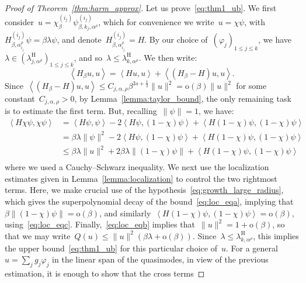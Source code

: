 \documentclass[10pt]{article}
\newcommand{\1}{\mathbbm 1}
\newcommand{\deltaScalingExp}{s}
\newcommand{\shift}{\rho} %
\renewcommand{\o}{\mathrm{o}}
\begin{document}
\begin{proof}[Proof of Theorem~\ref{thm:harm_approx}]
        Let us prove~\eqref{eq:thm1_ub}.
        We first consider~$u = \chi_\beta^{(i_j)} \psi_{\beta,k_j,\alpha^\shift}^{(i_j)}$, which for convenience we write~$u=\chi\psi$, with~$H_{\beta,\alpha_{i_j}^\shift}^{(i_j)} \psi = \beta\lambda\psi$, and denote~$H_{\beta,\alpha_{i_j}^\shift}^{(i_j)}=H$.
        By our choice of~$(\varphi_j)_{1\leq j\leq k}$, we have~$\lambda \in (\lambda_{j,\alpha^\shift}^{\mathrm H})_{1\leq j\leq k}$, and so~$\lambda\leq \lambda_{k,\alpha^\shift}^{\mathrm H}$.
        We then write:
        \[\left\langle H_\beta u,u\right\rangle = \left\langle H u,u\right\rangle + \left\langle (H_\beta - H)u,u\right\rangle.\]
        Since~$\left\langle (H_\beta-H)u,u\right\rangle \leq C_{j,\alpha,\shift}\beta^{3\deltaScalingExp+\frac12}\|u\|^2 = \o(\beta)\|u\|^2$ for some constant~$C_{j,\alpha,\shift}>0$, by Lemma~\ref{lemma:taylor_bound}, the only remaining task is to estimate the first term.
        But, recalling~$\|\psi\| = 1$, we have:
        \[\begin{aligned}
            \left\langle H\chi\psi,\chi\psi\right\rangle &= \left\langle H\psi,\psi\right\rangle - 2\left\langle H\psi,(1-\chi)\psi\right\rangle + \left\langle H(1-\chi)\psi,(1-\chi)\psi\right\rangle\\
            & = \beta\lambda\|\psi\|^2 - 2\left\langle H\psi,(1-\chi)\psi\right\rangle + \left\langle H(1-\chi)\psi,(1-\chi)\psi\right\rangle\\
            &\leq \beta\lambda\|u\|^2 + 2\beta\lambda\|(1-\chi)\psi\| + \left\langle H(1-\chi)\psi,(1-\chi)\psi\right\rangle\\
        \end{aligned}\]
        where we used a Cauchy--Schwarz inequality.
        We next use the localization estimates given in Lemma~\ref{lemma:localization} to control the two rightmost terms. Here, we make crucial use of the hypothesis~\eqref{eq:growth_large_radius},
        which gives the superpolynomial decay of the bound~\eqref{eq:loc_eqa}, implying that~$\beta\|(1-\chi)\psi\|=\o(\beta)$, and similarly~$\left\langle H(1-\chi)\psi,(1-\chi)\psi\right\rangle = \o(\beta)$, using~\eqref{eq:loc_eqc}.
        Finally,~\eqref{eq:loc_eqb} implies that~$\|u\|^2 = 1 + \o(\beta)$, so that we may write~$Q(u)\leq \|u\|^2(\beta\lambda + \o(\beta))$.
        Since~$\lambda\leq \lambda_{k,\alpha^\shift}^{\mathrm H}$, this implies the upper bound~\eqref{eq:thm1_ub} for this particular choice of~$u$.
        For a general~$u = \sum_j g_j \varphi_j$ in the linear span of the quasimodes, in view of the previous estimation, it is enough to show that the cross terms

\end{proof}
\end{document}

